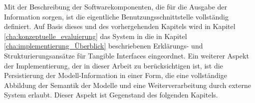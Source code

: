 Mit der Beschreibung der Softwarekomponenten, die für die Ausgabe der Information sorgen, ist die eigentliche Benutzungsschnittstelle vollständig definiert. Auf Basis dieses und des vorhergehenden Kapitels wird in Kapitel \ref{cha:konzeptuelle_evaluierung} das System in die in Kapitel \ref{cha:implementierung_Überblick} beschriebenen Erklärungs- und Strukturierungsansätze für Tangible Interfaces eingeordnet. Ein weiterer Aspekt der Implementierung, der in dieser Arbeit zu berücksichtigen ist, ist die Persistierung der Modell-Information in einer Form, die eine vollständige Abbildung der Semantik der Modelle und eine Weiterverarbeitung durch externe System erlaubt. Dieser Aspekt ist Gegenstand des folgenden Kapitels.

